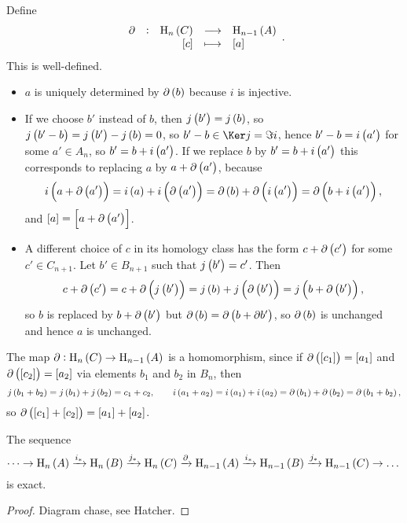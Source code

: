 Define
$$ \function[\partial]{\H_n\br{C}}{\H_{n - 1}\br{A}}{\sbr{c}}{\sbr{a}}. $$
This is well-defined.
\begin{itemize}
\item $ a $ is uniquely determined by $ \partial\br{b} $ because $ i $ is injective.
\item If we choose $ b' $ instead of $ b $, then $ j\br{b'} = j\br{b} $, so $ j\br{b' - b} = j\br{b'} - j\br{b} = 0 $, so $ b' - b \in \Ker j = \Im i $, hence $ b' - b = i\br{a'} $ for some $ a' \in A_n $, so $ b' = b + i\br{a'} $. If we replace $ b $ by $ b' = b + i\br{a'} $ this corresponds to replacing $ a $ by $ a + \partial\br{a'} $, because
$$ i\br{a + \partial\br{a'}} = i\br{a} + i\br{\partial\br{a'}} = \partial\br{b} + \partial\br{i\br{a'}} = \partial\br{b + i\br{a'}}, $$
and $ \sbr{a} = \sbr{a + \partial\br{a'}} $.
\item A different choice of $ c $ in its homology class has the form $ c + \partial\br{c'} $ for some $ c' \in C_{n + 1} $. Let $ b' \in B_{n + 1} $ such that $ j\br{b'} = c' $. Then
$$ c + \partial\br{c'} = c + \partial\br{j\br{b'}} = j\br{b} + j\br{\partial\br{b'}} = j\br{b + \partial\br{b'}}, $$
so $ b $ is replaced by $ b + \partial\br{b'} $ but $ \partial\br{b} = \partial\br{b + \partial b'} $, so $ \partial\br{b} $ is unchanged and hence $ a $ is unchanged.
\end{itemize}

\pagebreak

The map $ \partial : \H_n\br{C} \to \H_{n - 1}\br{A} $ is a homomorphism, since if $ \partial\br{\sbr{c_1}} = \sbr{a_1} $ and $ \partial\br{\sbr{c_2}} = \sbr{a_2} $ via elements $ b_1 $ and $ b_2 $ in $ B_n $, then
$$ j\br{b_1 + b_2} = j\br{b_1} + j\br{b_2} = c_1 + c_2, \qquad i\br{a_1 + a_2} = i\br{a_1} + i\br{a_2} = \partial\br{b_1} + \partial\br{b_2} = \partial\br{b_1 + b_2}, $$
so $ \partial\br{\sbr{c_1} + \sbr{c_2}} = \sbr{a_1} + \sbr{a_2} $.

\begin{theorem}
The sequence
$$ \dots \to \H_n\br{A} \xrightarrow{i_*} \H_n\br{B} \xrightarrow{j_*} \H_n\br{C} \xrightarrow{\partial} \H_{n - 1}\br{A} \xrightarrow{i_*} \H_{n - 1}\br{B} \xrightarrow{j_*} \H_{n - 1}\br{C} \to \dots $$
is exact.
\end{theorem}

\begin{proof}
Diagram chase, see Hatcher.
\end{proof}

